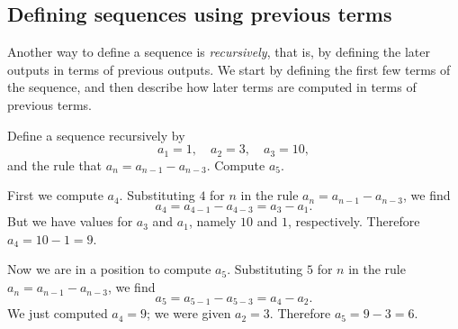 \documentclass{ximera}
\begin{document}
\subsection{Defining sequences using previous terms}
\label{subsection:recursive-definition}

Another way to define a sequence is \textit{recursively}, that is, by
defining the later outputs in terms of previous outputs.  We start by
defining the first few terms of the sequence, and then describe how
later terms are computed in terms of previous terms.

\begin{example}
Define a sequence recursively by
$$
a_1 = 1, \quad a_2 = 3, \quad a_3 = 10,
$$
and the rule that $a_n = a_{n-1} - a_{n-3}$.  Compute $a_5$.
\end{example}

\begin{explanation}
  First we compute $a_4$.  Substituting $4$ for $n$ in the rule $a_n = a_{n-1} - a_{n-3}$, we find
$$
a_4 = a_{4-1} - a_{4-3} = a_3 - a_1.
$$
But we have values for $a_3$ and $a_1$, namely $10$ and $1$, respectively.  Therefore $a_4 = 10 - 1 = 9$.

Now we are in a position to compute $a_5$.  Substituting $5$ for $n$ in the rule $a_n = a_{n-1} - a_{n-3}$, we find
$$
a_5 = a_{5-1} - a_{5-3} = a_4 - a_2.
$$
We just computed $a_4 = 9$; we were given $a_2 = 3$.  Therefore $a_5 = 9 - 3 = 6$.
\end{explanation}

\end{document}
